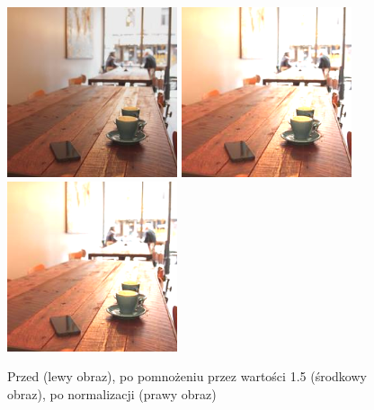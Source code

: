 \documentclass[a4paper,12pt]{book}
\begin{document}
\begin{figure}[H]
	\caption{Przed (lewy obraz), po pomnożeniu przez wartości 1.5 (środkowy obraz), po normalizacji (prawy obraz)}
	\includegraphics[width=5cm, height=5cm]{coffee-unmodified.jpg}
	\includegraphics[width=5cm, height=5cm]{3-2/multiply-color-const-coffee-15.png}
	\includegraphics[width=5cm, height=5cm]{3-2/multiply-color-const-coffee-15-norm.png}
\end{figure}
\end{document}
